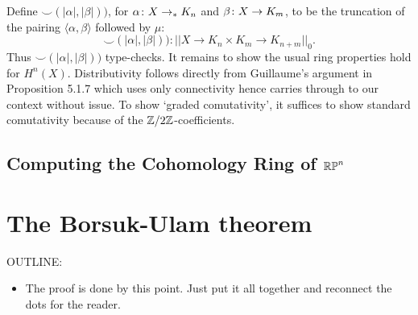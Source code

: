 \documentclass{amsart}
\begin{document}

Define
$ \smile ( |\alpha|, |\beta|) ) $, for
$ \alpha \colon X \to_\ast K_n $ and
$ \beta \colon X \to K_m $, to be the truncation of the
pairing $ \langle \alpha, \beta \rangle $ followed by $ \mu $:
\[
\smile ( |\alpha|, |\beta|) ) :
|| X \to K_n \times K_m \to K_{n+m} ||_0.
\]
Thus $ \smile ( |\alpha|, |\beta|) ) $ type-checks. It
remains to show the usual ring properties hold for $ H^n(X)
$.  Distributivity follows directly from Guillaume's
argument in Proposition 5.1.7 which uses only connectivity
hence carries through to our context without issue.  To show
`graded comutativity', it suffices to show standard
comutativity because of the $ \mathbb{Z}/2\mathbb{Z} $-coefficients.  





\subsection{Computing the Cohomology Ring of $\mathbb{RP}^n$}




\section{The Borsuk-Ulam theorem}
\label{sec:borsuk-ulam}

OUTLINE:
\begin{itemize}
\item
  The proof is done by this point. Just put it all
  together and reconnect the dots for the reader.
\end{itemize}



\nocite{shul:bfp,brunerie:thesis,br:rp-hott}

\end{document}
